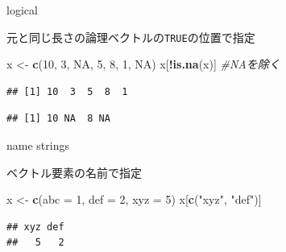 \documentclass[ignorenonframetext,]{beamer}
\newenvironment{Shaded}{\begin{snugshade}}{\end{snugshade}}
\newcommand{\KeywordTok}[1]{\textcolor[rgb]{0.13,0.29,0.53}{\textbf{#1}}}
\newcommand{\DataTypeTok}[1]{\textcolor[rgb]{0.13,0.29,0.53}{#1}}
\newcommand{\DecValTok}[1]{\textcolor[rgb]{0.00,0.00,0.81}{#1}}
\newcommand{\StringTok}[1]{\textcolor[rgb]{0.31,0.60,0.02}{#1}}
\newcommand{\CommentTok}[1]{\textcolor[rgb]{0.56,0.35,0.01}{\textit{#1}}}
\newcommand{\OtherTok}[1]{\textcolor[rgb]{0.56,0.35,0.01}{#1}}
\newcommand{\OperatorTok}[1]{\textcolor[rgb]{0.81,0.36,0.00}{\textbf{#1}}}
\newcommand{\NormalTok}[1]{#1}
\begin{document}
\begin{frame}[fragile]{logical}

元と同じ長さの論理ベクトルの\texttt{TRUE}の位置で指定

\begin{Shaded}
\begin{Highlighting}[]
\NormalTok{x <-}\StringTok{ }\KeywordTok{c}\NormalTok{(}\DecValTok{10}\NormalTok{, }\DecValTok{3}\NormalTok{, }\OtherTok{NA}\NormalTok{, }\DecValTok{5}\NormalTok{, }\DecValTok{8}\NormalTok{, }\DecValTok{1}\NormalTok{, }\OtherTok{NA}\NormalTok{)}
\NormalTok{x[}\OperatorTok{!}\KeywordTok{is.na}\NormalTok{(x)] }\CommentTok{#NAを除く}
\end{Highlighting}
\end{Shaded}

\begin{verbatim}
## [1] 10  3  5  8  1
\end{verbatim}

\begin{Shaded}
\end{Shaded}

\begin{verbatim}
## [1] 10 NA  8 NA
\end{verbatim}

\end{frame}

\begin{frame}[fragile]{name strings}

ベクトル要素の名前で指定

\begin{Shaded}
\begin{Highlighting}[]
\NormalTok{x <-}\StringTok{ }\KeywordTok{c}\NormalTok{(}\DataTypeTok{abc =} \DecValTok{1}\NormalTok{, }\DataTypeTok{def =} \DecValTok{2}\NormalTok{, }\DataTypeTok{xyz =} \DecValTok{5}\NormalTok{)}
\NormalTok{x[}\KeywordTok{c}\NormalTok{(}\StringTok{"xyz"}\NormalTok{, }\StringTok{"def"}\NormalTok{)]}
\end{Highlighting}
\end{Shaded}

\begin{verbatim}
## xyz def 
##   5   2
\end{verbatim}

\end{frame}
\end{document}
